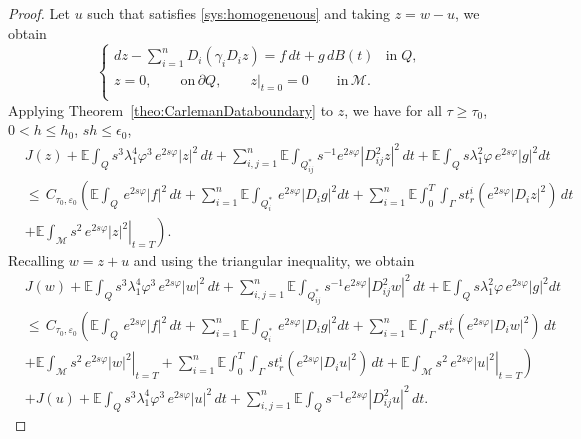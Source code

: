 \documentclass[11pt,oneside,leqno]{amsart}
\numberwithin{equation}{section}
\numberwithin{equation}{section}
\newcommand{\E}{\mathbb{E}}
\begin{document}
\begin{proof}
Let $u$ such that satisfies \eqref{sys:homogeneuous} and taking $z=w-u$, we obtain
\begin{equation*}
    \begin{cases}
     dz-\sum_{i=1}^{n}D_i(\gamma_{i}D_i z)=f\,dt+g\,dB(t)    &\text{in}\; Q , \\
     z=0,\quad\quad\text{on}\,\partial Q,\quad\quad\left.z\right|_{t=0}=0 \quad\quad\text{in}\, \mathcal{M}.\\ 
    \end{cases}
\end{equation*}
Applying Theorem~\ref{theo:CarlemanDataboundary} to $z$, we have for all $\tau\geq \tau_0$, $0<h\leq h_0$, $sh\leq \epsilon_0$,
\begin{equation*}
\begin{split}
&J(z)+\E\int_{Q}s^{3}\lambda^{4}_{1}\varphi^{3}\,e^{2s\varphi}|z|^{2}\,dt+\sum_{i,j=1}^{n}\E\int_{Q_{ij}^{\ast}}s^{-1}e^{2s\varphi}|D_{ij}^2z|^2\, dt+\E\int_{Q}s\lambda_{1}^2\varphi\,e^{2s\varphi}|g|^2dt\\
&\leq\,C_{\tau_{0},\varepsilon_0}\left(\E\int_{Q}\,e^{2s\varphi}|f|^2\,dt+\sum_{i=1}^{n}\E\int_{Q_i^{\ast}}\,e^{2s\varphi}|D_{i}g|^2dt+\sum_{i=1}^{n}\E\int_0^T\int_{\Gamma}st_{r}^{i}(e^{2s\varphi}|D_iz|^2)\,dt\right.\\
&\left.+\left.\E\int_{\mathcal{M}}s^2\,e^{2s\varphi}|z|^2\right|_{t=T}\right).
\end{split}
\end{equation*}
Recalling $w=z+u$ and using the triangular inequality, we obtain
\begin{equation}\label{eq:fiC}
\begin{split}
&J(w)+\E\int_{Q}s^{3}\lambda^{4}_{1}\varphi^{3}\,e^{2s\varphi}|w|^{2}\,dt+\sum_{i,j=1}^{n}\E\int_{Q_{ij}^\ast}s^{-1}e^{2s\varphi}|D_{ij}^2w|^2\, dt+\E\int_{Q}s\lambda_{1}^2\varphi\,e^{2s\varphi}|g|^2dt\\
&\leq\,C_{\tau_{0},\varepsilon_0}\left(\E\int_{Q}\,e^{2s\varphi}|f|^2\,dt+\sum_{i=1}^{n}\E\int_{Q_i^{\ast}}\,e^{2s\varphi}|D_{i}g|^2dt+\sum_{i=1}^{n}\E\int_{\Gamma}st_{r}^{i}(e^{2s\varphi}|D_iw|^2)\,dt\right.\\
&\left.+\left.\E\int_{\mathcal{M}}s^2\,e^{2s\varphi}|w|^2\right|_{t=T}+\sum_{i=1}^{n}\E\int_0^T\int_{\Gamma}st_{r}^{i}(e^{2s\varphi}|D_iu|^2)\,dt+\left.\E\int_{\mathcal{M}}s^2\,e^{2s\varphi}|u|^2\right|_{t=T}\right)\\
&+J(u)+\E\int_{Q}s^{3}\lambda^{4}_{1}\varphi^{3}\,e^{2s\varphi}|u|^{2}\,dt+{ \sum_{i,j=1}^{n}}\E\int_{Q}s^{-1}e^{2s\varphi}|D_{ij}^2u|^2\, dt.

\end{split}
\end{equation}
\end{proof}
\end{document}
